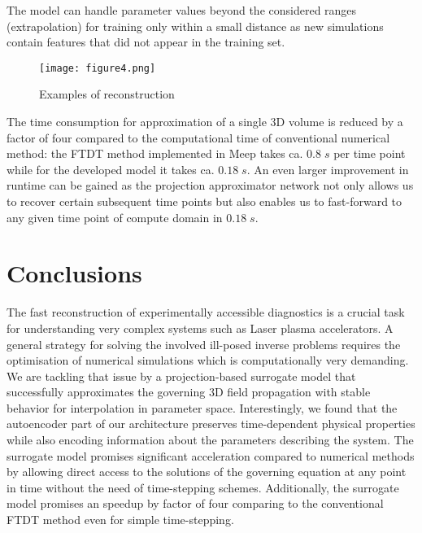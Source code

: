 \documentclass{article} %
\begin{document}
The model can handle parameter values beyond the considered ranges (extrapolation) for training only within a small distance as new simulations contain features that did not appear in the training set. 

\begin{figure}[t]
  \centering
  \texttt{[image: figure4.png]}
  \caption{Examples of reconstruction}
  \label{fig:rec2}
\end{figure}

The time consumption for approximation of a single 3D volume is reduced by a factor of four compared to the computational time of conventional numerical method: the FTDT method implemented in Meep takes ca. $0.8\;s$ per time point while for the developed model it takes ca. $0.18\;s$. 
An even larger improvement in runtime can be gained as the projection approximator network not only allows us to recover certain subsequent time points but also enables us to fast-forward to any given time point of compute domain in $0.18\;s$.


\section{Conclusions}
The fast reconstruction of experimentally accessible diagnostics is a crucial task for understanding very complex systems such as Laser plasma accelerators. A general strategy for solving the involved ill-posed inverse problems requires the optimisation of numerical simulations which is computationally very demanding. We are tackling that issue by a projection-based surrogate model that successfully approximates the governing 3D field propagation with stable behavior for interpolation in parameter space. Interestingly, we found that the autoencoder part of our architecture preserves time-dependent physical properties while also encoding information about the parameters describing the system. The surrogate model promises significant acceleration compared to numerical methods by allowing direct access to the solutions of the governing equation at any point in time without the need of time-stepping schemes. Additionally, the surrogate model promises an speedup by factor of four comparing to the conventional FTDT method even for simple time-stepping. 

\newpage


\end{document}
